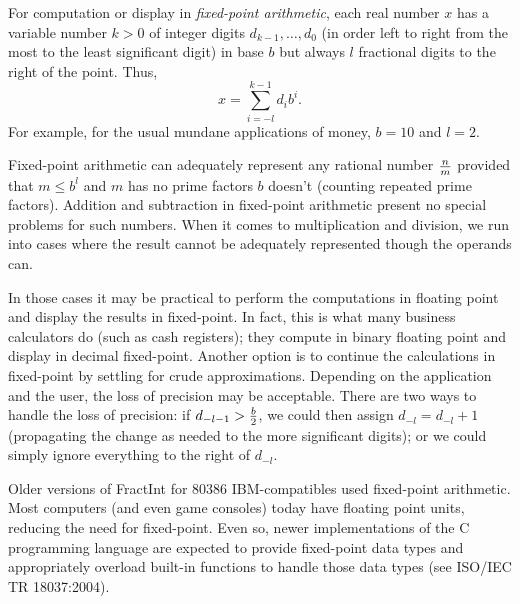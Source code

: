 \documentclass[12pt]{article}
\begin{document}
For computation or display in {\em fixed-point arithmetic}, each real number $x$ has a variable number $k > 0$ of integer digits $d_{k - 1}, \ldots, d_0$ (in order left to right from the most to the least significant digit) in base $b$ but always $l$ fractional digits to the right of the point. Thus, $$x = \sum_{i = -l}^{k - 1} d_ib^i.$$ For example, for the usual mundane applications of money, $b = 10$ and $l = 2$.

Fixed-point arithmetic can adequately represent any rational number ${n \over m}$ provided that $m \leq b^l$ and $m$ has no prime factors $b$ doesn't (counting repeated prime factors). Addition and subtraction in fixed-point arithmetic present no special problems for  such numbers. When it comes to multiplication and division, we run into cases where the result cannot be adequately represented though the operands can.

In those cases it may be practical to perform the computations in floating point and display the results in fixed-point. In fact, this is what many business calculators do (such as cash registers); they compute in binary floating point and display in decimal fixed-point. Another option is to continue the calculations in fixed-point by settling for crude approximations. Depending on the application and the user, the loss of precision may be acceptable. There are two ways to handle the loss of precision: if $d_{-l-1} > {b \over 2}$, we could then assign $d_{-l} = d_{-l} + 1$ (propagating the change as needed to the more significant digits); or we could simply ignore everything to the right of $d_{-l}$.

Older versions of FractInt for 80386 IBM-compatibles used fixed-point arithmetic. Most computers (and even game consoles) today have floating point units, reducing the need for fixed-point. Even so, newer implementations of the C programming language are expected to provide fixed-point data types and appropriately overload built-in functions to handle those data types (see ISO/IEC TR 18037:2004).
\end{document}
